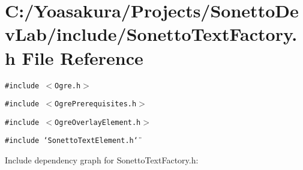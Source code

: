 \section{C:/Yoasakura/Projects/SonettoDevLab/include/SonettoTextFactory.h File Reference}
\label{_sonetto_text_factory_8h}
{\tt \#include $<$Ogre.h$>$}\par
{\tt \#include $<$OgrePrerequisites.h$>$}\par
{\tt \#include $<$OgreOverlayElement.h$>$}\par
{\tt \#include \char`\"{}SonettoTextElement.h\char`\"{}}\par


Include dependency graph for SonettoTextFactory.h: